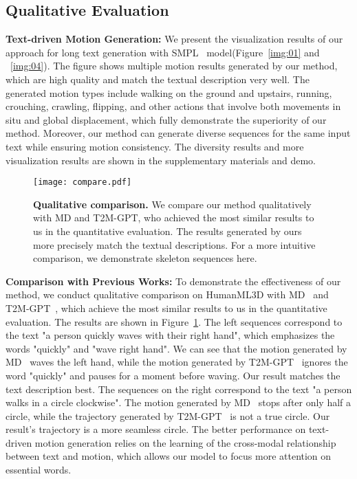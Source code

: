 \documentclass[10pt,twocolumn,letterpaper]{article}
\begin{document}
\subsection{Qualitative Evaluation}\label{ssec:sota_quali}
\textbf{Text-driven Motion Generation:}
We present the visualization results of our approach for long text generation with SMPL~\cite{loper2015smpl} model(Figure~\ref{img:01} and ~\ref{img:04}). The figure shows multiple motion results generated by our method, which are high quality and match the textual description very well. The generated motion types include walking on the ground and upstairs, running, crouching, crawling, flipping, and other actions that involve both movements in situ and global displacement, which fully demonstrate the superiority of our method. Moreover, our method can generate diverse sequences for the same input text while ensuring motion consistency. The diversity results and more visualization results are shown in the supplementary materials and demo.
\begin{figure}[t]
    \centering
    \texttt{[image: compare.pdf]}
    \caption{\textbf{Qualitative comparison.} We compare our method qualitatively with MD and T2M-GPT, who achieved the most similar results to us in the quantitative evaluation. The results generated by ours more precisely match the textual descriptions. For a more intuitive comparison, we demonstrate skeleton sequences here.}
    \label{img:05}
\end{figure}

\textbf{Comparison with Previous Works:}
To demonstrate the effectiveness of our method, we conduct qualitative comparison on HumanML3D with MD~\cite{zhang2022motiondiffuse} and T2M-GPT~\cite{zhang2023t2m}, which achieve the most similar results to us in the quantitative evaluation. The results are shown in Figure~\ref{img:05}. The left sequences correspond to the text "a person quickly waves with their right hand", which emphasizes the words "quickly" and "wave right hand". We can see that the motion generated by MD~\cite{zhang2022motiondiffuse} waves the left hand, while the motion generated by T2M-GPT~\cite{zhang2023t2m} ignores the word "quickly" and pauses for a moment before waving. Our result matches the text description best. The sequences on the right correspond to the text "a person walks in a circle clockwise". The motion generated by MD~\cite{zhang2022motiondiffuse} stops after only half a circle, while the trajectory generated by T2M-GPT~\cite{zhang2023t2m} is not a true circle. Our result's trajectory is a more seamless circle. The better performance on text-driven motion generation relies on the learning of the cross-modal relationship between text and motion, which allows our model to focus more attention on essential words.
\end{document}
